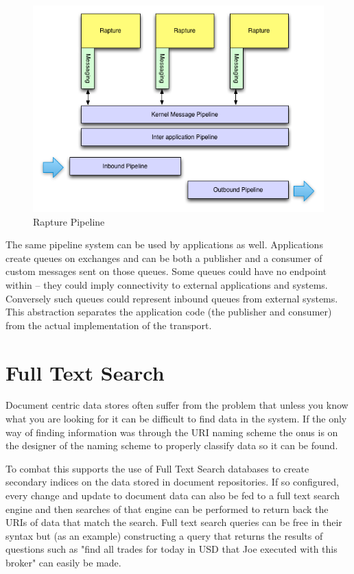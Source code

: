 \begin{figure}[H]
\centering
\includegraphics[scale=0.75]{Graphics/PipelineExplain}
\caption{Rapture Pipeline}
\label{fig:PipelineExample}
\end{figure}

The same pipeline system can be used by applications as well. Applications create queues on exchanges and can be both a publisher and a consumer of custom messages
sent on those queues. Some queues could have no endpoint within \Rapture -- they could imply connectivity to external applications and systems. Conversely such queues could
represent inbound queues from external systems. This abstraction separates the application code (the publisher and consumer) from the actual implementation of the transport.

\section{Full Text Search}
Document centric data stores often suffer from the problem that unless you know what you are looking for it can be difficult to
find data in the system. If the only way of finding information was through the URI naming scheme the onus is on the designer
of the naming scheme to properly classify data so it can be found.

To combat this \Rapture supports the use of Full Text Search databases to create secondary indices on the data stored in
document repositories. If so configured, every change and update to document data can also be fed to a full text search engine
and then searches of that engine can be performed to return back the URIs of data that match the search. Full text search queries can
be free in their syntax but (as an example) constructing a query that returns the results of questions such as "find all trades for today in USD that Joe executed with this broker" can
easily be made.

